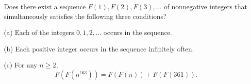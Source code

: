 Does there exist a sequence $F(1), F(2), F(3), \ldots$ of nonnegative integers that simultaneously satisfies the following three conditions?

(a) Each of the integers $0, 1, 2, \ldots$ occurs in the sequence.

(b) Each positive integer occurs in the sequence infinitely often.

(c) For any $n \geq 2$,
\[ F\left(F(n^{163})\right) = F(F(n)) + F(F(361)). \]
